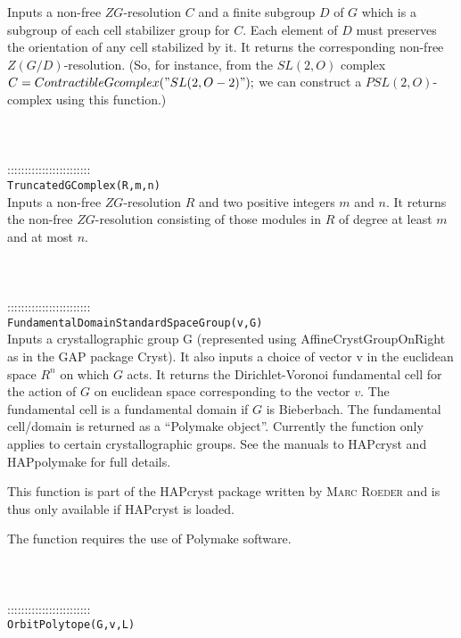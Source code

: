 \documentclass[a4paper,11pt]{report}
\begin{document}
{ Inputs a non-free $ZG$-resolution $C$ and a finite subgroup $D$ of $G$ which is a subgroup of each cell stabilizer group for $C$. Each element of $D$ must preserves the orientation of any cell stabilized by it. It returns the
corresponding non-free $Z(G/D)$-resolution. (So, for instance, from the $SL(2,O)$ complex $C=ContractibleGcomplex("SL(2,O-2)");$ we can construct a $PSL(2,O)$-complex using this function.) \\
 \\
 \\
 \\
 ::::::::::::::::::::::::\\
 \texttt{TruncatedGComplex(R,m,n)}\\
 

 Inputs a non-free $ZG$-resolution $R$ and two positive integers $m $ and $ n $. It returns the non-free $ZG$-resolution consisting of those modules in $R$ of degree at least $m$ and at most $n$. \\
 \\
 \\
 \\
 ::::::::::::::::::::::::\\
 \texttt{FundamentalDomainStandardSpaceGroup(v,G)}\\
 

 Inputs a crystallographic group G (represented using AffineCrystGroupOnRight
as in the GAP package Cryst). It also inputs a choice of vector v in the
euclidean space $R^n$ on which $G$ acts. It returns the Dirichlet-Voronoi fundamental cell for the action of $G$ on euclidean space corresponding to the vector $v$. The fundamental cell is a fundamental domain if $G$ is Bieberbach. The fundamental cell/domain is returned as a ``Polymake object''. Currently the function only applies to certain crystallographic groups. See
the manuals to HAPcryst and HAPpolymake for full details. 

 This function is part of the HAPcryst package written by \textsc{Marc Roeder} and is thus only available if HAPcryst is loaded. 

 The function requires the use of Polymake software. \\
 \\
 \\
 \\
 ::::::::::::::::::::::::\\
 \texttt{OrbitPolytope(G,v,L) }\\
 

}
\end{document}
